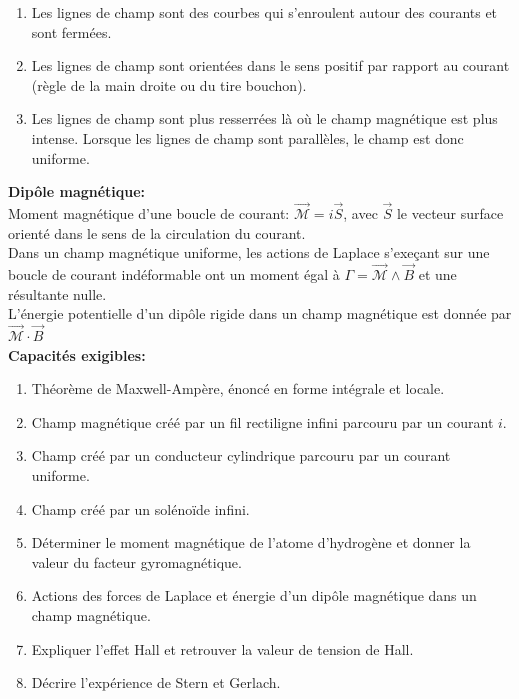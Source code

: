 \documentclass{article}
\begin{document}
\begin{enumerate}
  \item Les lignes de champ sont des courbes qui s'enroulent autour des courants et sont fermées. 
  \item Les lignes de champ sont orientées dans le sens positif par rapport au courant (règle de
  la main droite ou du tire bouchon). 
  \item Les lignes de champ sont plus resserrées là où le champ magnétique est plus intense. Lorsque les lignes de champ sont parallèles, le champ est donc uniforme.\\[0.2cm]
\end{enumerate}

\textbf{Dipôle magnétique: }\\

Moment magnétique d'une boucle de courant: $\vec{\mathcal{M}} = i \vec{S}$, avec $\vec{S}$ le vecteur surface orienté dans le sens de la circulation du courant. \\
Dans un champ magnétique uniforme, les actions de Laplace s'exeçant sur une boucle de courant indéformable ont un moment égal à $\Gamma = \vec{\mathcal{M}} \wedge \vec{B}$ et une résultante nulle.  \\
L'énergie potentielle d'un dipôle rigide dans un champ magnétique est donnée par $\vec{\mathcal{M}} \cdot \vec{B}$ \\

\textbf{Capacités exigibles: }
\begin{enumerate}
  \item Théorème de Maxwell-Ampère, énoncé en forme intégrale et locale. 
  \item Champ magnétique créé par un fil rectiligne infini parcouru par un courant $i$.
  \item Champ créé par un conducteur cylindrique parcouru par un courant uniforme. 
  \item Champ créé par un solénoïde infini. 
  \item Déterminer le moment magnétique de l'atome d'hydrogène et donner la valeur du facteur gyromagnétique. 
  \item Actions des forces de Laplace et énergie d'un dipôle magnétique dans un champ magnétique.
  \item Expliquer l'effet Hall et retrouver la valeur de tension de Hall. 
  \item Décrire l'expérience de Stern et Gerlach.
\end{enumerate}
\end{document}

